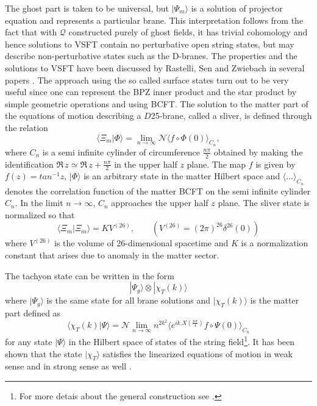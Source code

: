 \documentclass[a4paper,12pt]{article}
\begin{document}
The ghost part is taken to be universal, but $|\Psi_m\rangle$ is a solution
of projector equation and represents a particular brane.
This interpretation follows from
the fact that with $\mathcal{Q}$ constructed purely of ghost fields, 
it has trivial
cohomology and hence solutions to VSFT contain no perturbative open string
states, but may describe non-perturbative states such as the D-branes. 
The properties and the solutions to VSFT have been discussed by
Rastelli, Sen and Zwiebach in several papers \cite{rsz1,rsz2,rsz3,rsz}.
The approach using the so called surface states turn out to be 
very useful since one can represent the BPZ inner product and 
the star product by simple geometric
operations and using BCFT. The solution to the matter part of the equations of
motion describing a $D$25-brane, called a sliver, is defined through the
relation \cite{rsz3,rsz}
\begin{equation}
\langle\Xi_m|\Phi\rangle= \lim_{n\to\infty}
\mathcal{N}
\langle f\circ\Phi(0)\rangle_{C_n},
\label{7}
\end{equation}
where $C_n$ is a semi infinite cylinder of circumference $\frac{n\pi}{2}$ 
obtained by making the identification
 ${\Re}\,z\simeq{\Re}\,z+\frac{n\pi}{2}$ in the upper half $z$ plane.
The map $f$ is given by $f(z)=tan^{-1}z$, $|\Phi\rangle$ is an arbitrary state 
in the matter Hilbert space and
$\langle\dots\rangle_{C_n}$ denotes the correlation function of the matter
BCFT on the semi infinite cylinder $C_n$. In the limit $n\to\infty$, $C_n$ 
approaches the upper half $z$ plane. The sliver state is
normalized so that
\begin{equation}
\langle\Xi_m|\Xi_m\rangle=KV^{(26)}, \qquad (V^{(26)}=(2\pi)^{26}
\delta^{26}(0))
\label{8}
\end{equation}
where $V^{(26)}$ is the volume of 26-dimensional spacetime and $K$ is a
normalization constant that arises due to anomaly in the matter sector.

The tachyon state can be written in the form \cite{hk,rsz4,rv}
\begin{equation}
|\Psi_g\rangle\otimes|\chi_T(k)\rangle
\label{9}
\end{equation}
where $|\Psi_g\rangle$ is the same state for all brane solutions and
$|\chi_T(k)\rangle$ is the matter part defined as
\begin{equation}
\langle\chi_T(k)|\Psi\rangle=\mathcal{N}\lim_{n\to\infty} n^{2k^2}
\langle e^{ik.X(\frac{n\pi}{4})}f\circ\Psi(0)\rangle_{C_n} 
\label{10}
\end{equation}
for any state  $|\Psi\rangle$ in the Hilbert space of states of the string 
field\footnote{For more detais about the general construction see
\cite{rsz3,rsz}.}. It has been shown that the state $|\chi_T\rangle$ 
satisfies the linearized equations of motion in weak sense \cite{rsz4} and
in strong sense as well \cite{rv}.
\end{document}
